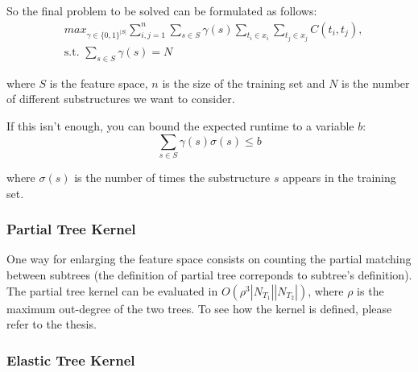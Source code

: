 So the final problem to be solved can be formulated as follows:
\begin{align*}
	& max_{\gamma \in \{0, 1\}^{|S|}} \sum_{i, j = 1}^n \sum_{s \in S} \gamma(s)
		\sum_{t_i \in x_i}
		\sum_{t_j \in x_j} C(t_i, t_j), \\
	& \text{s.t. } \sum_{s \in S} \gamma(s) = N
\end{align*}

where $S$ is the feature space, $n$ is the size of the training set and $N$ is
the number of different substructures we want to consider.

If this isn't enough, you can bound the expected runtime to a variable $b$:
\begin{equation*}
	\sum_{s \in S} \gamma(s) \sigma(s) \leq b
\end{equation*}

where $\sigma(s)$ is the number of times the substructure $s$ appears in the
training set.

\subsubsection{Partial Tree Kernel}

One way for enlarging the feature space consists on counting the partial
matching between subtrees (the definition of partial tree correponds to
subtree's definition). The partial tree kernel can be evaluated in
$O(\rho^3|N_{T_1}||N_{T_2}|)$, where $\rho$ is the maximum out-degree of the two
trees. To see how the kernel is defined, please refer to the thesis.

\subsubsection{Elastic Tree Kernel}

